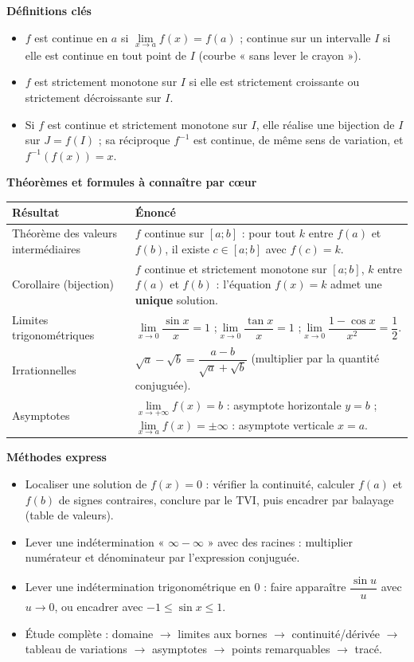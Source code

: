\documentclass[11pt]{article}
\newcommand{\cle}[1]{{\popxbold\color{popdark}#1}}
\begin{document}
\begin{bilan}
\textbf{Définitions clés}
\begin{itemize}
\item $f$ est \cle{continue} en $a$ si $\lim\limits_{x\to a}f(x)=f(a)$ ; continue sur un intervalle $I$ si elle est continue en tout point de $I$ (courbe « sans lever le crayon »).
\item $f$ est \cle{strictement monotone} sur $I$ si elle est strictement croissante ou strictement décroissante sur $I$.
\item Si $f$ est continue et strictement monotone sur $I$, elle réalise une \cle{bijection} de $I$ sur $J=f(I)$ ; sa \cle{réciproque} $f^{-1}$ est continue, de même sens de variation, et $f^{-1}(f(x))=x$.
\end{itemize}

\textbf{Théorèmes et formules à connaître par c\oe ur}
\begin{center}
\begin{tabularx}{\linewidth}{|l|X|}
\hline
\rowcolor{popblueL} \textbf{Résultat} & \textbf{Énoncé} \\
\hline
Théorème des valeurs intermédiaires & $f$ continue sur $[a;b]$ : pour tout $k$ entre $f(a)$ et $f(b)$, il existe $c\in[a;b]$ avec $f(c)=k$. \\
\hline
Corollaire (bijection) & $f$ continue et strictement monotone sur $[a;b]$, $k$ entre $f(a)$ et $f(b)$ : l'équation $f(x)=k$ admet une \textbf{unique} solution. \\
\hline
Limites trigonométriques & $\lim\limits_{x\to0}\dfrac{\sin x}{x}=1$ ;\quad $\lim\limits_{x\to0}\dfrac{\tan x}{x}=1$ ;\quad $\lim\limits_{x\to0}\dfrac{1-\cos x}{x^2}=\dfrac12$. \\
\hline
Irrationnelles & $\sqrt{a}-\sqrt{b}=\dfrac{a-b}{\sqrt{a}+\sqrt{b}}$ (multiplier par la quantité conjuguée). \\
\hline
Asymptotes & $\lim\limits_{x\to+\infty}f(x)=b$ : asymptote horizontale $y=b$ ;\quad $\lim\limits_{x\to a}f(x)=\pm\infty$ : asymptote verticale $x=a$. \\
\hline
\end{tabularx}
\end{center}

\textbf{Méthodes express}
\begin{itemize}
\item \cle{Localiser une solution} de $f(x)=0$ : vérifier la continuité, calculer $f(a)$ et $f(b)$ de signes contraires, conclure par le TVI, puis encadrer par balayage (table de valeurs).
\item \cle{Lever une indétermination} « $\infty-\infty$ » avec des racines : multiplier numérateur et dénominateur par l'expression conjuguée.
\item \cle{Lever une indétermination} trigonométrique en $0$ : faire apparaître $\dfrac{\sin u}{u}$ avec $u\to0$, ou encadrer avec $-1\leq\sin x\leq1$.
\item \cle{Étude complète} : domaine $\to$ limites aux bornes $\to$ continuité/dérivée $\to$ tableau de variations $\to$ asymptotes $\to$ points remarquables $\to$ tracé.
\end{itemize}
\end{bilan}
\end{document}
